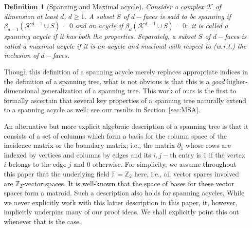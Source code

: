 \documentclass[12pt]{amsart}
\newcommand{\gt}[1]{\textcolor{blue}{#1}}
\newcommand{\remove}[1]{}
\renewcommand{\gt}[1]{#1}
\newtheorem{definition}[theorem]{Definition}
\numberwithin{equation}{section}
\numberwithin{theorem}{section}
\newcommand{\1}{\mathbf{1}}
\def\K{\mathcal{K}}
\def\bF{\mathbb{F}}
\def\bZ{\mathbb{Z}}
\begin{document}
\begin{definition}[Spanning and Maximal acycle]
\label{def:SA}
Consider a complex $\K$ of dimension at least $d$, $d \geq 1$. \gt{A subset $S$ of $d-$faces is said to be {\em spanning} if $\beta_{d-1}(\K^{d-1} \cup S) = 0$ and an {\em acycle} if $\beta_{d}(\K^{d-1} \cup S) = 0;$ it is called a {\em spanning acycle} if it has both the properties. Separately,} a subset $S$ of $d-$faces is called a {\em maximal acycle} if it is an acycle and maximal with respect to (w.r.t.) the inclusion of $d-$faces.
\end{definition}
%

Though this definition of a spanning acycle merely replaces appropriate indices in the definition of a spanning tree, what is not obvious is that this is a \emph{good} higher-dimensional generalization of a spanning tree. \gt{This work of ours is the first to formally ascertain that several key properties of a spanning tree naturally extend to a spanning acycle as well; see our results in Section~\ref{sec:MSA}.}

\gt{An alternative but} more explicit algebraic description of a spanning tree is that  it consists of a set of columns which form a basis for the column space of the incidence matrix or \gt{the} boundary matrix; i.e., the matrix  $\partial_1$ whose rows are indexed by vertices and columns by edges \remove{such that the} \gt{and its} $i,j-$th entry is $1$ if the vertex $i$ belongs to the edge $j$ and $0$ otherwise. For simplicity, we \remove{are assuming our} \gt{assume throughout this paper that the} underlying field $\bF = \bZ_2$ here, i.e., all vector spaces involved are $\bZ_2$-vector spaces. It is well-known that the space of bases for these vector spaces form a matroid. Such a description also holds for spanning acycles. \gt{While we never explicitly work with this latter description in this paper, it, however, implicitly underpins many of our proof ideas. We shall explicitly point this out whenever that is the case.} 
\end{document}
